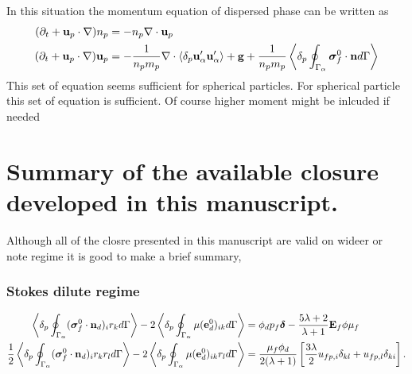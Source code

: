 In this situation the momentum equation of dispersed phase can be written as 
\begin{align}
    (\partial_t  
    + \textbf{u}_p \cdot\mathbf{\nabla} )n_p
    &= 
    - n_p \mathbf{\nabla}\cdot \textbf{u}_p 
    \\
    (\partial_t + \textbf{u}_p \cdot \mathbf{\nabla})  \textbf{u}_p
    &= 
    -  \frac{1}{n_pm_p}\mathbf{\nabla}\cdot \left<\delta_p \textbf{u}_\alpha'\textbf{u}_\alpha'\right>
    + \textbf{g}
    + \frac{1}{n_pm_p}\left<\delta_p \oint_{\Gamma_{\alpha}} \bm\sigma_f^0 \cdot \textbf{n} d\Gamma\right>
\end{align}
This set of equation seems sufficient for spherical particles. 
For spherical particle this set of equation is sufficient. 
Of course higher moment might be inlcuded if needed 

\section{Summary of the available closure developed in this manuscript. }

Although all of the closre presented in this manuscript are valid on wideer or note regime it is good to make a brief summary, 

\subsubsection{Stokes dilute regime}
\begin{align}
    \pavg{\intS{(\bm{\sigma}_f^0 \cdot \textbf{n}_d)_ir_k}} -
2\pSavg{{\mu(\textbf{e}_d^0)_{ik}}} 
&= 
\phi_d p_f\bm\delta
- \frac{5\lambda +2}{\lambda +1}
\textbf{E}_f \phi \mu_f
\label{eq:first}
\\
\frac{1}{2}\pavg{\intS{(\bm{\sigma}_f^0 \cdot \textbf{n}_d)_ir_kr_l}} -
2\pSavg{{\mu(\textbf{e}_d^0)_{ik} r_l}} 
&= 
\frac{\mu_f\phi_d}{2(\lambda +1) }
\left[
    \frac{3\lambda}{2} 
    u_{fp,i}\delta_{kl}
    +  u_{fp,l}\delta_{ki}
\right]. 
\label{eq:second}
\end{align}

